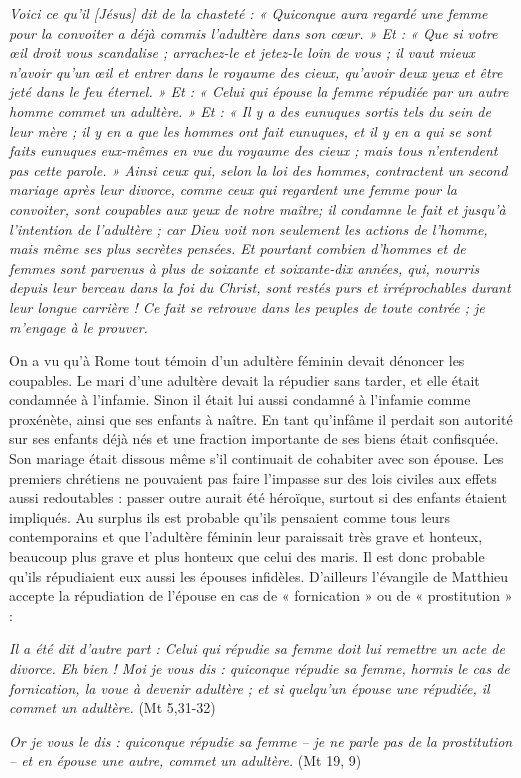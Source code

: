 \begin{displayquote}
\emph{Voici ce qu'il \emph{[Jésus]} dit de la chasteté : « Quiconque aura regardé une femme pour la convoiter a déjà commis l'adultère dans son cœur. » Et : « Que si votre œil droit vous scandalise ; arrachez-le et jetez-le loin de vous ; il vaut mieux n'avoir qu'un œil et entrer dans le royaume des cieux, qu'avoir deux yeux et être jeté dans le feu éternel. » Et : « Celui qui épouse la femme répudiée par un autre homme commet un adultère. » Et : « Il y a des eunuques sortis tels du sein de leur mère ; il y en a que les hommes ont fait eunuques, et il y en a qui se sont faits eunuques eux-mêmes en vue du royaume des cieux ; mais tous n'entendent pas cette parole. » Ainsi ceux qui, selon la loi des hommes, contractent un second mariage après leur divorce, comme ceux qui regardent une femme pour la convoiter, sont coupables aux yeux de notre maître; il condamne le fait et jusqu'à l'intention de l'adultère ; car Dieu voit non seulement les actions de l'homme, mais même ses plus secrètes pensées. Et pourtant combien d'hommes et de femmes sont parvenus à plus de soixante et soixante-dix années, qui, nourris depuis leur berceau dans la foi du Christ, sont restés purs et irréprochables durant leur longue carrière ! Ce fait se retrouve dans les peuples de toute contrée ; je m'engage à le prouver.}
\end{displayquote}
 
 On a vu qu'à Rome tout témoin d'un adultère féminin devait dénoncer les coupables. Le mari d'une adultère devait la répudier sans tarder, et elle était condamnée à l'infamie. Sinon il était lui aussi condamné à l'infamie comme proxénète, ainsi que ses enfants à naître. En tant qu'infâme il perdait son autorité sur ses enfants déjà nés et une fraction importante de ses biens était confisquée. Son mariage était dissous même s'il continuait de cohabiter avec son épouse. Les premiers chrétiens ne pouvaient pas faire l'impasse sur des lois civiles aux effets aussi redoutables : passer outre aurait été héroïque, surtout si des enfants étaient impliqués. Au surplus ils est probable qu'ils pensaient comme tous leurs contemporains et que l'adultère féminin leur paraissait très grave et honteux, beaucoup plus grave et plus honteux que celui des maris. Il est donc probable qu'ils répudiaient eux aussi les épouses infidèles. D'ailleurs l'évangile de Matthieu accepte la répudiation de l'épouse en cas de « fornication » ou de « prostitution »  :

\begin{displayquote}
\emph{Il a été dit d'autre part : Celui qui répudie sa femme doit lui remettre un acte de divorce. Eh bien ! Moi je vous dis : quiconque répudie sa femme, hormis le cas de fornication, la voue à devenir adultère ; et si quelqu'un épouse une répudiée, il commet un adultère.} (Mt 5,31-32)

\emph{Or je vous le dis : quiconque répudie sa femme -- je ne parle pas de la prostitution -- et en épouse une autre, commet un adultère.} (Mt 19, 9)
\end{displayquote}


